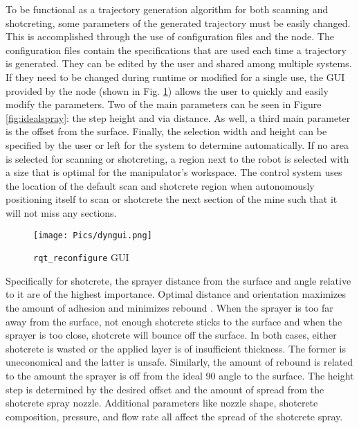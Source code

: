 To be functional as a trajectory generation algorithm for both scanning and shotcreting, some parameters of the generated trajectory must be easily changed. This is accomplished through the use of configuration files and the  node. The configuration files contain the specifications that are used each time a trajectory is generated. They can be edited by the user and shared among multiple systems. If they need to be changed during runtime or modified for a single use, the GUI provided by the  node (shown in Fig. \ref{fig:dyngui}) allows the user to quickly and easily modify the parameters. Two of the main parameters can be seen in Figure \ref{fig:idealspray}: the step height and via distance. As well, a third main parameter is the offset from the surface. Finally, the selection width and height can be specified by the user or left for the system to determine automatically. If no area is selected for scanning or shotcreting, a region next to the robot is selected with a size that is optimal for the manipulator's workspace. The control system uses the location of the default scan and shotcrete region when autonomously positioning itself to scan or shotcrete the next section of the mine such that it will not miss any sections.\\

\begin{figure}[h]
    \centering
    \texttt{[image: Pics/dyngui.png]}
    \caption{\texttt{rqt\_reconfigure} GUI}
    \label{fig:dyngui}
\end{figure}

Specifically for shotcrete, the sprayer distance from the surface and angle relative to it are of the highest importance. Optimal distance and orientation maximizes the amount of adhesion and minimizes rebound  \cite{spraypat}. When the sprayer is too far away from the surface, not enough shotcrete sticks to the surface and when the sprayer is too close, shotcrete will bounce off the surface. In both cases, either shotcrete is wasted or the applied layer is of insufficient thickness. The former is uneconomical and the latter is unsafe. Similarly, the amount of rebound is related to the amount the sprayer is off from the ideal 90\degree\hspace{0pt} angle to the surface. The height step is determined by the desired offset and the amount of spread from the shotcrete spray nozzle.  Additional parameters like nozzle shape, shotcrete composition, pressure, and flow rate all affect the spread of the shotcrete spray.\\

